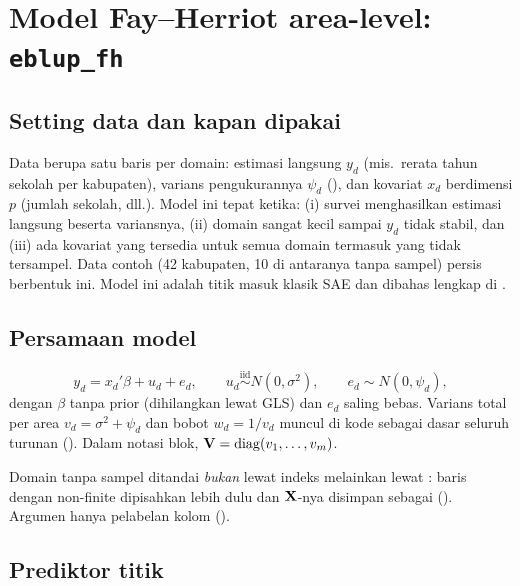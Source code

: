 \section{Model Fay--Herriot area-level: \texttt{eblup\_fh}}\label{sec:fh}

\subsection{Setting data dan kapan dipakai}\label{sec:fh-setting}

Data berupa satu baris per domain: estimasi langsung $y_d$ (mis.\ rerata
tahun sekolah per kabupaten), varians pengukurannya $\psi_d$ (),
dan kovariat $x_d$ berdimensi $p$ (jumlah sekolah, dll.). Model ini tepat
ketika: (i) survei menghasilkan estimasi langsung beserta variansnya, (ii)
domain sangat kecil sampai $y_d$ tidak stabil, dan (iii) ada kovariat yang
tersedia untuk semua domain termasuk yang tidak tersampel. Data contoh
 (42 kabupaten, 10 di antaranya tanpa sampel) persis berbentuk ini.
Model ini adalah titik masuk klasik SAE \citep{fay1979small} dan dibahas
lengkap di \citet{rao2015small}.

\subsection{Persamaan model}\label{sec:fh-model}

\begin{equation}
  y_d=x_d'\beta+u_d+e_d,\qquad
  u_d\overset{\text{iid}}{\sim}N(0,\sigma^2),\qquad
  e_d\sim N(0,\psi_d),
  \label{eq:fh-model}
\end{equation}
dengan $\beta$ tanpa prior (dihilangkan lewat GLS) dan $e_d$ saling bebas.
Varians total per area $v_d=\sigma^2+\psi_d$ dan bobot
$w_d=1/v_d$ muncul di kode sebagai dasar seluruh turunan
(). Dalam notasi blok, $\mathbf{V}=\operatorname{diag}(v_1,\dots,v_m)$.

Domain tanpa sampel ditandai \emph{bukan} lewat indeks melainkan lewat
: baris dengan  non-finite dipisahkan lebih dulu dan
$\mathbf{X}$-nya disimpan sebagai  ().
Argumen  hanya pelabelan kolom ().

\subsection{Prediktor titik}\label{sec:fh-prediktor}

